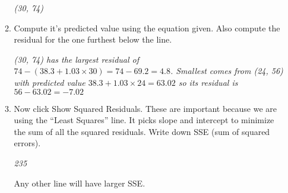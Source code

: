 \begin{enumerate}
\begin{enumerate}
\begin{key}
  {\it (30, 74)}
\end{key}
\item Compute it's predicted value using the equation given.  Also
     compute the residual for the one furthest below the line.
\begin{students}
 \vspace{1cm}      
\end{students}

\begin{key}
  {\it (30, 74) has the largest residual of $74 - (38.3 +1.03\times
    30) = 74 - 69.2 = 4.8$.   Smallest comes from (24, 56) with
    predicted value $38.3+1.03\times 24 = 63.02$ so its residual is
    $56 - 63.02 = -7.02$ }
\end{key}
   \item Now click {\sf Show Squared Residuals}.  These are important
     because we are using the ``Least Squares'' line. It picks slope
     and intercept to minimize the sum of all the squared residuals.
     Write down SSE (sum of squared errors). 
\begin{students}
 \vspace{1cm}      
\end{students}

\begin{key}
  {\it 235}
\end{key} 
Any other line will have larger SSE.
\end{enumerate}
\end{enumerate}

